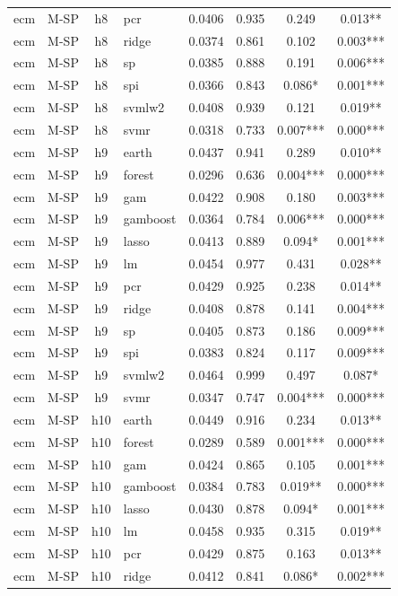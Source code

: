 \begin{ThreePartTable}
\begin{longtable}[t]{llclcccc}
ecm & M-SP & h8 & pcr & 0.0406 & 0.935 & 0.249 & 0.013**\\
ecm & M-SP & h8 & ridge & 0.0374 & 0.861 & 0.102 & 0.003***\\
ecm & M-SP & h8 & sp & 0.0385 & 0.888 & 0.191 & 0.006***\\
ecm & M-SP & h8 & spi & 0.0366 & 0.843 & 0.086* & 0.001***\\
ecm & M-SP & h8 & svmlw2 & 0.0408 & 0.939 & 0.121 & 0.019**\\
ecm & M-SP & h8 & svmr & 0.0318 & 0.733 & 0.007*** & 0.000***\\
\addlinespace
ecm & M-SP & h9 & earth & 0.0437 & 0.941 & 0.289 & 0.010**\\
ecm & M-SP & h9 & forest & 0.0296 & 0.636 & 0.004*** & 0.000***\\
ecm & M-SP & h9 & gam & 0.0422 & 0.908 & 0.180 & 0.003***\\
ecm & M-SP & h9 & gamboost & 0.0364 & 0.784 & 0.006*** & 0.000***\\
ecm & M-SP & h9 & lasso & 0.0413 & 0.889 & 0.094* & 0.001***\\
ecm & M-SP & h9 & lm & 0.0454 & 0.977 & 0.431 & 0.028**\\
ecm & M-SP & h9 & pcr & 0.0429 & 0.925 & 0.238 & 0.014**\\
ecm & M-SP & h9 & ridge & 0.0408 & 0.878 & 0.141 & 0.004***\\
ecm & M-SP & h9 & sp & 0.0405 & 0.873 & 0.186 & 0.009***\\
ecm & M-SP & h9 & spi & 0.0383 & 0.824 & 0.117 & 0.009***\\
ecm & M-SP & h9 & svmlw2 & 0.0464 & 0.999 & 0.497 & 0.087*\\
ecm & M-SP & h9 & svmr & 0.0347 & 0.747 & 0.004*** & 0.000***\\
\addlinespace
ecm & M-SP & h10 & earth & 0.0449 & 0.916 & 0.234 & 0.013**\\
ecm & M-SP & h10 & forest & 0.0289 & 0.589 & 0.001*** & 0.000***\\
ecm & M-SP & h10 & gam & 0.0424 & 0.865 & 0.105 & 0.001***\\
ecm & M-SP & h10 & gamboost & 0.0384 & 0.783 & 0.019** & 0.000***\\
ecm & M-SP & h10 & lasso & 0.0430 & 0.878 & 0.094* & 0.001***\\
ecm & M-SP & h10 & lm & 0.0458 & 0.935 & 0.315 & 0.019**\\
ecm & M-SP & h10 & pcr & 0.0429 & 0.875 & 0.163 & 0.013**\\
ecm & M-SP & h10 & ridge & 0.0412 & 0.841 & 0.086* & 0.002***\\

\end{longtable}
\end{ThreePartTable}

